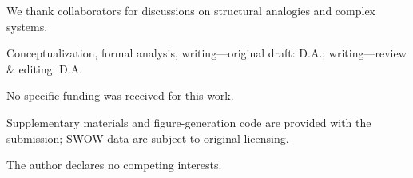 \documentclass[sn-basic]{sn-jnl}
\begin{document}
We thank collaborators for discussions on structural analogies and complex systems.

Conceptualization, formal analysis, writing---original draft: D.A.; writing---review \& editing: D.A.

No specific funding was received for this work.

Supplementary materials and figure-generation code are provided with the submission; SWOW data are subject to original licensing.

The author declares no competing interests.



\end{document}
